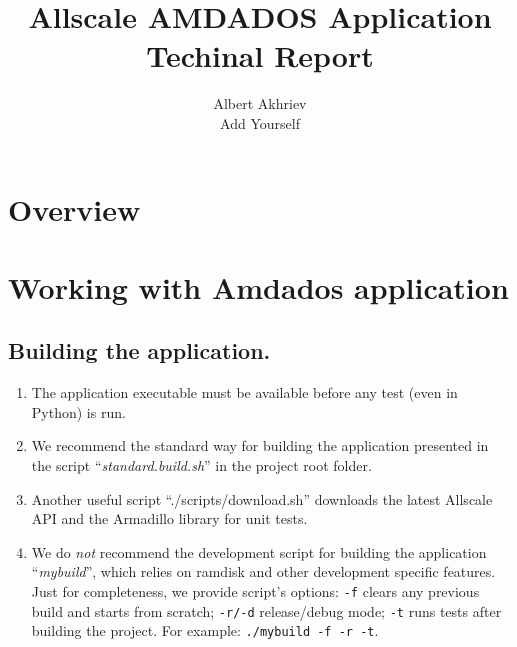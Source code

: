 \documentclass[]{article}
\title{Allscale AMDADOS Application \\ Techinal Report}
\author{Albert Akhriev \\ Add Yourself}
\begin{document}
\maketitle

\section{Overview}



\section{Working with Amdados application}

\subsection{Building the application.}
\begin{enumerate}
\item The application executable must be available before any test (even in Python) is run.
\item We recommend the standard way for building the application presented in the script ``\textit{standard.build.sh}'' in the project root folder.
\item Another useful script ``./scripts/download.sh'' downloads the latest Allscale API and the Armadillo library for unit tests.
\item We do \textit{not} recommend the development script for building the application ``\textit{mybuild}'', which relies on ramdisk and other development specific features. Just for completeness, we provide script's options: \texttt{-f} clears any previous build and starts from scratch; \texttt{-r/-d} release/debug mode; \texttt{-t} runs tests after building the project. For example: \texttt{./mybuild -f -r -t}.
\end{enumerate}

\end{document}
